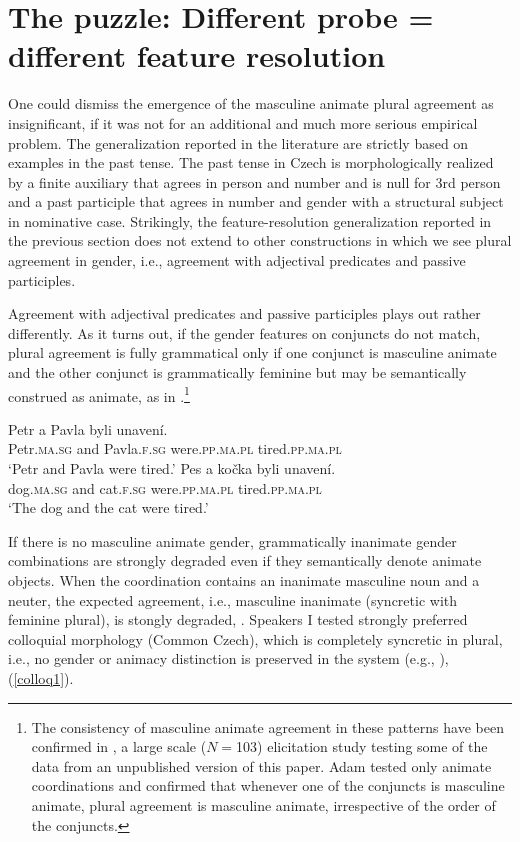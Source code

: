 \documentclass[output=paper,
modfonts
newtxmath,
hidelinks
]{langscibook}
\begin{document}
\section{The puzzle: Different probe = different feature resolution}\label{sec:puzzle}

One could dismiss the emergence of the masculine animate plural agreement as insignificant, if it was not for an additional and much more serious empirical problem. The generalization reported in the literature are strictly based on examples in the past tense. The past tense in Czech is morphologically realized by a finite auxiliary that agrees in person and number and is null for 3rd person and a past participle that agrees in number and gender with a structural subject in nominative case. Strikingly, the feature-resolution generalization reported in the previous section does not extend to other constructions in which we see plural agreement in gender, i.e., agreement with adjectival predicates and passive participles. 

Agreement with adjectival predicates and passive participles plays out rather differently. As it turns out, if the gender features on conjuncts do not match, plural agreement is fully grammatical only if one conjunct is masculine animate and the other conjunct is grammatically feminine but may be semantically construed as animate, as in .\footnote{The consistency of masculine animate agreement in these patterns have been confirmed in \citet{Adam:2017}, a large scale ($N={}$103) elicitation study testing some of the data from an unpublished version of this paper. Adam tested only animate coordinations and confirmed that whenever one of the conjuncts is masculine animate, plural agreement is masculine animate, irrespective of the order of the conjuncts.}


\ea\label{anim-2}
\ea\gll Petr a Pavla byli unavení.\\
Petr.\textsc{ma.sg} and Pavla.\textsc{f.sg} were.\textsc{pp.ma.pl} tired.\textsc{pp.ma.pl}\\
\glt `Petr and Pavla were tired.'\smallskip
\ex\gll  Pes a kočka byli unavení.\\
dog.\textsc{ma.sg} and cat.\textsc{f.sg} were.\textsc{pp.ma.pl} tired.\textsc{pp.ma.pl}\\
\glt `The dog and the cat were tired.'\\
\z
\hfill {}
\z

\noindent If there is no masculine animate gender, grammatically inanimate gender combinations are strongly degraded even if they semantically denote animate objects. When the coordination contains an inanimate masculine noun and a neuter, the expected agreement, i.e., masculine inanimate (syncretic with feminine plural), is stongly degraded, . Speakers I tested strongly preferred colloquial morphology (Common Czech), which is completely syncretic in plural, i.e., no gender or animacy distinction is preserved in the system (e.g., \citealt[76]{KarlikEtAl:2002}), (\ref{colloq1}).
\end{document}
